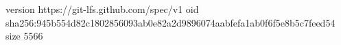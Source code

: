 version https://git-lfs.github.com/spec/v1
oid sha256:945b554d82c1802856093ab0e82a2d9896074aabfefa1ab0f6f5e8b5c7feed54
size 5566
